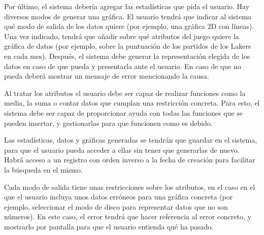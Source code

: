 Por último, el sistema debería agregar las estadísticas que pida el usuario. Hay diversos modos de generar una gráfica. El usuario tendrá que indicar al sistema qué modo de salida de los datos quiere (por ejemplo, una gráfica 2D con líneas). Una vez indicado, tendrá que añadir sobre qué atributos del juego quiere la gráfica de datos (por ejemplo, sobre la puntuación de los partidos de los Lakers en cada mes). Después, el sistema debe generar la representación elegida de los datos en caso de que pueda y presentarla ante el usuario. En caso de que no pueda deberá mostrar un mensaje de error mencionando la causa.

Al tratar los atributos el usuario debe ser capaz de realizar funciones como la media, la suma o contar datos que cumplan una restricción concreta. Para esto, el sistema debe ser capaz de proporcionar ayuda con todas las funciones que se pueden insertar, y gestionarlas para que funcionen como es debido.


Las estadísticas, datos y gráficas generadas se tendrán que guardar en el sistema, para que el usuario pueda acceder a ellas sin tener que generarlas de nuevo. Habrá acceso a un registro con orden inverso a la fecha de creación para facilitar la búsqueda en el mismo.

Cada modo de salida tiene unas restricciones sobre los atributos, en el caso en el que el usuario incluya unos datos erróneos para una gráfica concreta (por ejemplo, seleccionar el modo de disco para representar datos que no son números). En este caso, el error tendrá que hacer referencia al error concreto, y mostrarlo por pantalla para que el usuario entienda qué ha pasado. 
